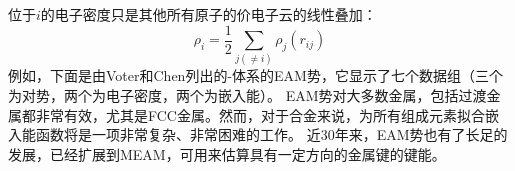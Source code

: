 位于$i$的电子密度只是其他所有原子的价电子云的线性叠加：
\begin{equation}
	\rho_i=\dfrac12\sum_{j(\neq i)}\rho_j(r_{ij})
	\label{eq:EAM_rho}
\end{equation}
例如，下面是由\textrm{Voter}和\textrm{Chen}\cite{MRSSP82-175_1987}列出的-体系的\textrm{EAM}势，它显示了七个数据组（三个为对势，两个为电子密度，两个为嵌入能）。
\textrm{EAM}势对大多数金属，包括过渡金属都非常有效，尤其是\textrm{FCC}金属。然而，对于合金来说，为所有组成元素拟合嵌入能函数将是一项非常复杂、非常困难的工作。%
近30年来，\textrm{EAM}势也有了长足的发展，已经扩展到\textrm{MEAM}，可用来估算具有一定方向的金属键的键能\cite{PRB46-2727_1992}。

